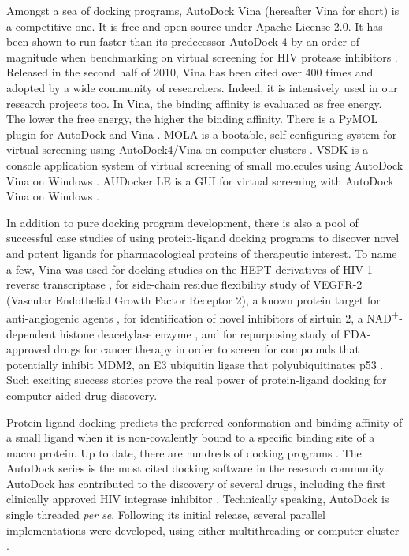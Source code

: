 Amongst a sea of docking programs, AutoDock Vina \citep{595} (hereafter Vina for short) is a competitive one. It is free and open source under Apache License 2.0. It has been shown to run faster than its predecessor AutoDock 4 \citep{596} by an order of magnitude when benchmarking on virtual screening for HIV protease inhibitors \citep{556}. Released in the second half of 2010, Vina has been cited over 400 times and adopted by a wide community of researchers. Indeed, it is intensively used in our research projects too. In Vina, the binding affinity is evaluated as free energy. The lower the free energy, the higher the binding affinity. There is a PyMOL plugin for AutoDock and Vina \citep{609}. MOLA is a bootable, self-configuring system for virtual screening using AutoDock4/Vina on computer clusters \citep{773}. VSDK is a console application system of virtual screening of small molecules using AutoDock Vina on Windows \citep{1268}. AUDocker LE is a GUI for virtual screening with AutoDock Vina on Windows \citep{1250}.

In addition to pure docking program development, there is also a pool of successful case studies of using protein-ligand docking programs to discover novel and potent ligands for pharmacological proteins of therapeutic interest. To name a few, Vina was used for docking studies on the HEPT derivatives of HIV-1 reverse transcriptase \citep{843}, for side-chain residue flexibility study of VEGFR-2 (Vascular Endothelial Growth Factor Receptor 2), a known protein target for anti-angiogenic agents \citep{1084}, for identification of novel inhibitors of sirtuin 2, a NAD\textsuperscript{+}-dependent histone deacetylase enzyme \citep{1177}, and for repurposing study of FDA-approved drugs for cancer therapy in order to screen for compounds that potentially inhibit MDM2, an E3 ubiquitin ligase that polyubiquitinates p53 \citep{1230}. Such exciting success stories prove the real power of protein-ligand docking for computer-aided drug discovery.

Protein-ligand docking predicts the preferred conformation and binding affinity of a small ligand when it is non-covalently bound to a specific binding site of a macro protein. Up to date, there are hundreds of docking programs \citep{493,922}. The AutoDock series is the most cited docking software in the research community. AutoDock has contributed to the discovery of several drugs, including the first clinically approved HIV integrase inhibitor \citep{1169}. Technically speaking, AutoDock is single threaded \textit{per se}. Following its initial release, several parallel implementations were developed, using either multithreading or computer cluster \citep{115,560,782}.

